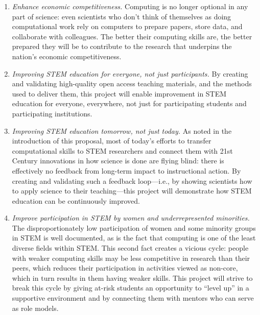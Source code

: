 \documentclass{proposalnsf}
\newlength{\up}
\begin{document}
\begin{enumerate}

\item
  \emph{Enhance economic competitiveness.} Computing is no longer
  optional in any part of science: even scientists who don't think of
  themselves as doing computational work rely on computers to prepare
  papers, store data, and collaborate with colleagues.  The better
  their computing skills are, the better prepared they will be to
  contribute to the research that underpins the nation's economic
  competitiveness.

\item
  \emph{Improving STEM education for everyone, not just participants.}
  By creating and validating high-quality open access teaching
  materials, and the methods used to deliver them, this project will
  enable improvement in STEM education for everyone, everywhere, not
  just for participating students and participating institutions.

\item
  \emph{Improving STEM education tomorrow, not just today.}  As noted
  in the introduction of this proposal, most of today's efforts to
  transfer computational skills to STEM researchers and connect them
  with 21st Century innovations in how science is done are flying
  blind: there is effectively no feedback from long-term impact to
  instructional action.  By creating and validating such a feedback
  loop---i.e., by showing scientists how to apply science to their
  teaching---this project will demonstrate how STEM education can be
  continuously improved.

\item
  \emph{Improve participation in STEM by women and underrepresented
    minorities.} The disproportionately low participation of women and
  some minority groups in STEM is well documented, as is the fact that
  computing is one of the least diverse fields within STEM.  This
  second fact creates a vicious cycle: people with weaker computing
  skills may be less competitive in research than their peers, which
  reduces their participation in activities viewed as non-core, which
  in turn results in them having weaker skills.  This project will
  strive to break this cycle by giving at-risk students an opportunity
  to ``level up'' in a supportive environment and by connecting them
  with mentors who can serve as role models.

\end{enumerate}
\end{document}
